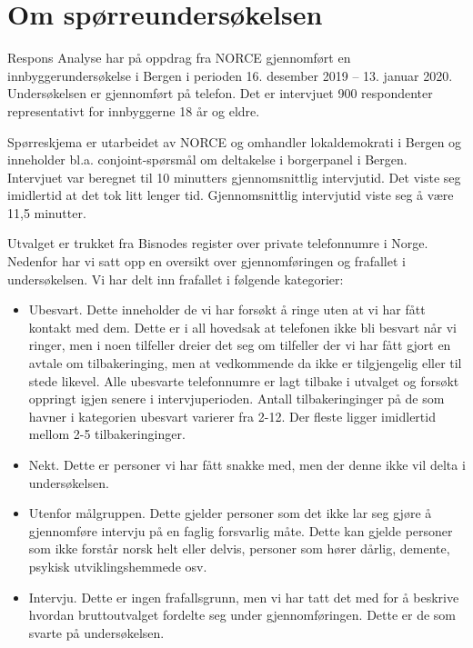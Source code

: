 \documentclass[
]{article}
\begin{document}
\hypertarget{om-spuxf8rreundersuxf8kelsen}{%
\section{Om spørreundersøkelsen}\label{om-spuxf8rreundersuxf8kelsen}}

Respons Analyse har på oppdrag fra NORCE gjennomført en
innbyggerundersøkelse i Bergen i perioden 16. desember 2019 -- 13.
januar 2020. Undersøkelsen er gjennomført på telefon. Det er intervjuet
900 respondenter representativt for innbyggerne 18 år og eldre.

Spørreskjema er utarbeidet av NORCE og omhandler lokaldemokrati i Bergen
og inneholder bl.a. conjoint-spørsmål om deltakelse i borgerpanel i
Bergen. Intervjuet var beregnet til 10 minutters gjennomsnittlig
intervjutid. Det viste seg imidlertid at det tok litt lenger tid.
Gjennomsnittlig intervjutid viste seg å være 11,5 minutter.

Utvalget er trukket fra Bisnodes register over private telefonnumre i
Norge. Nedenfor har vi satt opp en oversikt over gjennomføringen og
frafallet i undersøkelsen. Vi har delt inn frafallet i følgende
kategorier:

\begin{itemize}
\item
  Ubesvart. Dette inneholder de vi har forsøkt å ringe uten at vi har
  fått kontakt med dem. Dette er i all hovedsak at telefonen ikke bli
  besvart når vi ringer, men i noen tilfeller dreier det seg om
  tilfeller der vi har fått gjort en avtale om tilbakeringing, men at
  vedkommende da ikke er tilgjengelig eller til stede likevel. Alle
  ubesvarte telefonnumre er lagt tilbake i utvalget og forsøkt oppringt
  igjen senere i intervjuperioden. Antall tilbakeringinger på de som
  havner i kategorien ubesvart varierer fra 2-12. Der fleste ligger
  imidlertid mellom 2-5 tilbakeringinger.
\item
  Nekt. Dette er personer vi har fått snakke med, men der denne ikke vil
  delta i undersøkelsen.
\item
  Utenfor målgruppen. Dette gjelder personer som det ikke lar seg gjøre
  å gjennomføre intervju på en faglig forsvarlig måte. Dette kan gjelde
  personer som ikke forstår norsk helt eller delvis, personer som hører
  dårlig, demente, psykisk utviklingshemmede osv.
\item
  Intervju. Dette er ingen frafallsgrunn, men vi har tatt det med for å
  beskrive hvordan bruttoutvalget fordelte seg under gjennomføringen.
  Dette er de som svarte på undersøkelsen.
\end{itemize}
\end{document}
